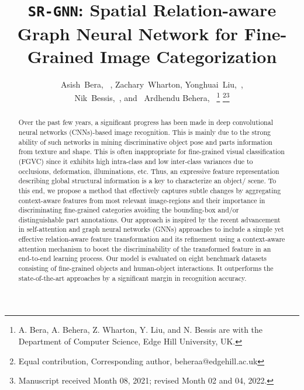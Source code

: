 \documentclass[journal]{IEEEtran}
\begin{document}
\title{\texttt{SR-GNN}: Spatial Relation-aware Graph Neural Network for Fine-Grained Image Categorization}
\author{Asish~Bera, ~,
        Zachary~Wharton, 
        Yonghuai~Liu,~, \\
        Nik~Bessis,~,
        and
        ~Ardhendu Behera,~
\thanks{A. Bera, A. Behera, Z. Wharton, Y. Liu, and N. Bessis   are with the Department of Computer Science, Edge Hill University, UK.}
\thanks{ Equal contribution,  Corresponding author, beheraa@edgehill.ac.uk}\thanks{Manuscript received Month 08, 2021; revised Month 02 and 04, 2022.}}

\maketitle
\begin{abstract}
Over the past few years, a significant progress has been made in deep convolutional neural networks (CNNs)-based image recognition. This is mainly due to the strong ability of such networks in mining discriminative object pose and parts information from texture and shape. This is often inappropriate for fine-grained visual classification (FGVC) since it exhibits high intra-class and low inter-class variances due to occlusions, deformation, illuminations, etc. Thus, an expressive feature representation describing global structural information is a key to characterize an object/ scene. To this end, we propose a method that effectively captures subtle changes by aggregating context-aware features from most relevant image-regions and their importance in discriminating fine-grained categories avoiding the bounding-box and/or distinguishable part annotations. Our approach is inspired by the recent advancement in self-attention and graph neural networks (GNNs) approaches to include a simple yet effective relation-aware feature transformation and its refinement using a context-aware attention mechanism to boost the discriminability of the transformed feature in an end-to-end learning process. Our model is evaluated on eight benchmark datasets consisting of fine-grained objects and human-object interactions. It outperforms the state-of-the-art approaches by a significant margin in recognition accuracy.
\end{abstract}
\end{document}
